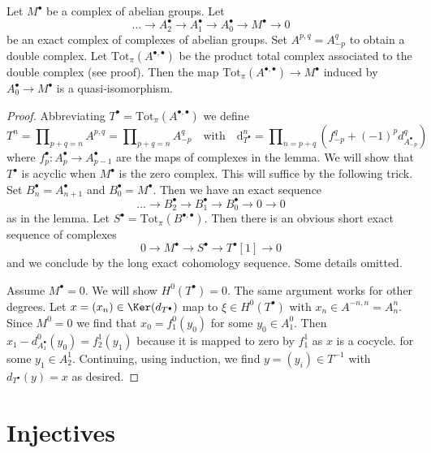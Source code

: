 \begin{lemma}
\label{lemma-resolution-gives-qis}
Let $M^\bullet$ be a complex of abelian groups. Let
$$
\ldots \to A_2^\bullet \to A_1^\bullet \to A_0^\bullet \to M^\bullet \to 0
$$
be an exact complex of complexes of abelian groups. Set $A^{p, q} = A_{-p}^q$
to obtain a double complex. Let $\text{Tot}_\pi(A^{\bullet, \bullet})$
be the product total complex associated to the double complex (see proof).
Then the map $\text{Tot}_\pi(A^{\bullet, \bullet}) \to M^\bullet$
induced by $A_0^\bullet \to M^\bullet$ is a quasi-isomorphism.
\end{lemma}

\begin{proof}
Abbreviating $T^\bullet = \text{Tot}_\pi(A^{\bullet, \bullet})$
we define
$$
T^n = \prod\nolimits_{p + q = n} A^{p, q} =
\prod\nolimits_{p + q = n} A_{-p}^q
\quad\text{with}\quad
\text{d}_{T^\bullet}^n =
\prod\nolimits_{n = p + q} (f_{-p}^q + (-1)^pd_{A_{-p}^\bullet}^q)
$$
where $f_p^\bullet : A_p^\bullet \to A_{p - 1}^\bullet$
are the maps of complexes in the lemma.
We will show that $T^\bullet$ is acyclic when
$M^\bullet$ is the zero complex. This will suffice by
the following trick. Set $B_n^\bullet = A_{n + 1}^\bullet$
and $B_0^\bullet = M^\bullet$. Then we have an exact sequence
$$
\ldots \to B_2^\bullet \to B_1^\bullet \to B_0^\bullet \to 0 \to 0
$$
as in the lemma. Let $S^\bullet = \text{Tot}_\pi(B^{\bullet, \bullet})$.
Then there is an obvious short exact sequence of complexes
$$
0 \to M^\bullet \to S^\bullet \to T^\bullet[1] \to 0
$$
and we conclude by the long exact cohomology sequence. Some details omitted.

\medskip\noindent
Assume $M^\bullet = 0$. We will show $H^0(T^\bullet) = 0$. The same argument
works for other degrees. Let $x =(x_n) \in \Ker(d_{T^\bullet})$
map to $\xi \in H^0(T^\bullet)$ with $x_n \in A^{-n, n} = A_n^n$.
Since $M^0 = 0$ we find that $x_0 = f_1^0(y_0)$ for some $y_0 \in A_1^0$.
Then $x_1 - d^0_{A_1^\bullet}(y_0) = f_2^1(y_1)$
because it is mapped to zero by $f_1^1$ as $x$ is a cocycle.
for some $y_1 \in A_2^1$. Continuing, using induction, we find
$y = (y_i) \in T^{-1}$ with $d_{T^\bullet}(y) = x$ as desired.
\end{proof}






\section{Injectives}
\label{section-injectives}

